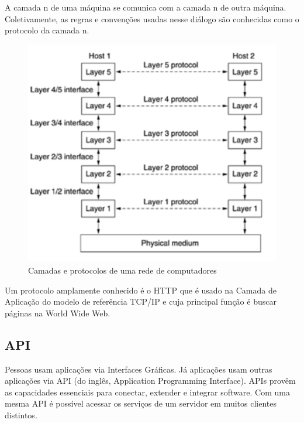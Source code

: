 A camada n de uma máquina se comunica com a camada n de outra máquina. 
Coletivamente, as regras e convenções usadas nesse diálogo são conhecidas como 
o protocolo da camada n. \cite{Tanenbaum2011}
\begin{figure}[H]
    \centering
    \includegraphics[scale=1.2]{images/layers_protocols}
    \caption[Camadas e protocolos de uma rede de computadores]
    {Camadas e protocolos de uma rede de computadores \cite{Tanenbaum2011}}
    \label{fig:layers_protocols}
\end{figure}

Um protocolo amplamente conhecido é o HTTP que é
usado na Camada de Aplicação do modelo de referência TCP/IP
e cuja principal função é buscar páginas na World Wide Web. \cite{Tanenbaum2011}

\subsection{API}
Pessoas usam aplicações via Interfaces Gráficas. Já aplicações usam outras 
aplicações via API (do inglês, Application Programming Interface). \cite{Biehl2015}
APIs provêm as capacidades essenciais para conectar, extender e integrar 
software. \cite{Biehl2015}
Com uma mesma API é possível acessar os serviços de um servidor em muitos clientes 
distintos.

